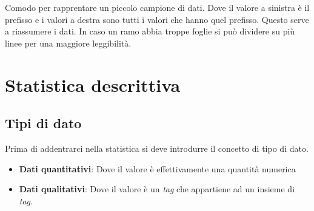 \documentclass{article}
\begin{document}
  \begin{minipage}[c]{0.30\textwidth}
      \centering
      \vspace{-2mm}
  \end{minipage}
  \hspace{2mm}
  \begin{minipage}[c]{0.6\textwidth}
    Comodo per rapprentare un piccolo campione di dati. Dove il valore a sinistra è il prefisso e i valori a destra sono tutti i valori che hanno quel prefisso. Questo serve a riassumere i dati. In caso un ramo abbia troppe foglie si può dividere su più linee per una maggiore leggibilità.
      \vspace{-3mm}
  \end{minipage}
  \vspace{1mm}
  
\section{Statistica descrittiva}

  \subsection{Tipi di dato}
    Prima di addentrarci nella statistica si deve introdurre il concetto di tipo di dato.
    \begin{itemize}
      \item \textbf{Dati quantitativi}: Dove il valore è effettivamente una quantità numerica
      \item \textbf{Dati qualitativi}: Dove il valore è un \textit{tag} che appartiene ad un insieme di \textit{tag}.
    \end{itemize}
    
\end{document}
